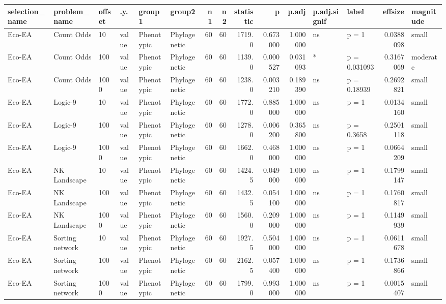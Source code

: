 \documentclass[]{book}
\begin{document}
\begin{table}
\centering
\begin{tabular}[t]{l|l|l|l|l|l|r|r|r|r|r|l|l|r|l}
\hline
selection\_name & problem\_name & offset & .y. & group1 & group2 & n1 & n2 & statistic & p & p.adj & p.adj.signif & label & effsize & magnitude\\
\hline
Eco-EA & Count Odds & 10 & value & Phenotypic & Phylogenetic & 60 & 60 & 1719.0 & 0.673000 & 1.000000 & ns & p = 1 & 0.0388098 & small\\
\hline
Eco-EA & Count Odds & 100 & value & Phenotypic & Phylogenetic & 60 & 60 & 1139.0 & 0.000527 & 0.031093 & * & p = 0.031093 & 0.3167069 & moderate\\
\hline
Eco-EA & Count Odds & 1000 & value & Phenotypic & Phylogenetic & 60 & 60 & 1238.0 & 0.003210 & 0.189390 & ns & p = 0.18939 & 0.2692821 & small\\
\hline
Eco-EA & Logic-9 & 10 & value & Phenotypic & Phylogenetic & 60 & 60 & 1772.0 & 0.885000 & 1.000000 & ns & p = 1 & 0.0134160 & small\\
\hline
Eco-EA & Logic-9 & 100 & value & Phenotypic & Phylogenetic & 60 & 60 & 1278.0 & 0.006200 & 0.365800 & ns & p = 0.3658 & 0.2501118 & small\\
\hline
Eco-EA & Logic-9 & 1000 & value & Phenotypic & Phylogenetic & 60 & 60 & 1662.0 & 0.468000 & 1.000000 & ns & p = 1 & 0.0664209 & small\\
\hline
Eco-EA & NK Landscape & 10 & value & Phenotypic & Phylogenetic & 60 & 60 & 1424.5 & 0.049000 & 1.000000 & ns & p = 1 & 0.1799147 & small\\
\hline
Eco-EA & NK Landscape & 100 & value & Phenotypic & Phylogenetic & 60 & 60 & 1432.5 & 0.054100 & 1.000000 & ns & p = 1 & 0.1760817 & small\\
\hline
Eco-EA & NK Landscape & 1000 & value & Phenotypic & Phylogenetic & 60 & 60 & 1560.0 & 0.209000 & 1.000000 & ns & p = 1 & 0.1149939 & small\\
\hline
Eco-EA & Sorting network & 10 & value & Phenotypic & Phylogenetic & 60 & 60 & 1927.5 & 0.504000 & 1.000000 & ns & p = 1 & 0.0611678 & small\\
\hline
Eco-EA & Sorting network & 100 & value & Phenotypic & Phylogenetic & 60 & 60 & 2162.5 & 0.057400 & 1.000000 & ns & p = 1 & 0.1736866 & small\\
\hline
Eco-EA & Sorting network & 1000 & value & Phenotypic & Phylogenetic & 60 & 60 & 1799.0 & 0.993000 & 1.000000 & ns & p = 1 & 0.0015407 & small\\

\end{tabular}
\end{table}
\end{document}
